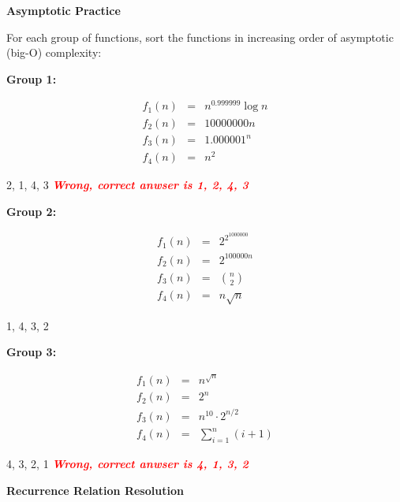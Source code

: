 \documentclass[12pt,twoside]{article}
\begin{document}
\begin{problems}

\problem {} \textbf{Asymptotic Practice}

For each group of functions, sort the functions in increasing order of
asymptotic (big-O) complexity:

\begin{problemparts}

\problempart {} \textbf{Group 1:}

$$
\begin{array}{rcl}
f_1(n) &=& n^{0.999999} \log n \\
f_2(n) &=& 10000000 n \\
f_3(n) &=& 1.000001^n \\
f_4(n) &=& n^2
\end{array}
$$

\ifsolution \solution{}
2, 1,  4, 3  \textcolor{red}{\textit{ \textbf{  Wrong, correct anwser is  1, 2, 4, 3}}}
\fi

\problempart {} \textbf{Group 2:}

$$
\begin{array}{rcl}
f_1(n) &=& 2^{2^{1000000}} \\
f_2(n) &=& 2^{100000n} \\
f_3(n) &=& \displaystyle \binom{n}{2} \\
f_4(n) &=& n \sqrt{n}
\end{array}
$$

\ifsolution \solution{}
1, 4, 3, 2 
\fi

\problempart {} \textbf{Group 3:}

$$
\begin{array}{rcl}
f_1(n) &=& n^{\sqrt{n}} \\
f_2(n) &=& 2^n \\
f_3(n) &=& n^{10} \cdot 2^{n / 2} \\
f_4(n) &=& \displaystyle\sum_{i = 1}^{n} (i + 1)
\end{array}
$$

\ifsolution \solution{}
4, 3, 2, 1 \textcolor{red}{\textit{ \textbf{  Wrong, correct anwser is  4, 1,  3, 2   }}}
\fi

\end{problemparts}

\problem {} \textbf{Recurrence Relation Resolution}


\end{problems}
\end{document}
